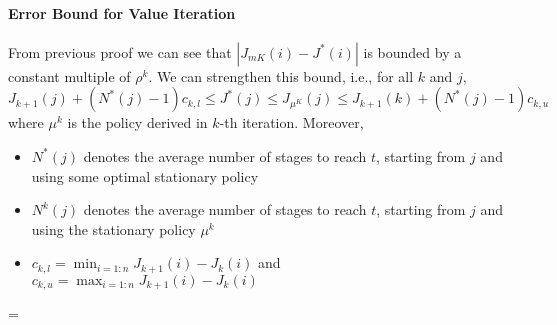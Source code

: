 \paragraph{Error Bound for Value Iteration}
From previous proof we can see that $|J_{mK}(i) - J^*(i)|$ is bounded by a constant multiple of $\rho^k$. We can strengthen this bound, i.e., for all $k$ and $j$,
\[
J_{k+1}(j) +(N^*(j) - 1)c_{k,l}\le J^*(j)\le J_{\mu^K}(j)\le J_{k+1}(k)+(N^*(j) - 1)c_{k,u}
\]
where $\mu^k$ is the policy derived in $k$-th iteration.
Moreover,
\begin{itemize}
\item
$N^*(j)$ denotes the average number of stages to reach $t$, starting from $j$ and using some optimal stationary policy
\item
$N^k(j)$ denotes the average number of stages to reach $t$, starting from $j$ and using the stationary policy $\mu^k$
\item
$c_{k,l}=\min_{i=1:n}J_{k+1}(i) - J_k(i)$ and $c_{k,u}=\max_{i=1:n}J_{k+1}(i) - J_k(i)$
\end{itemize}=
